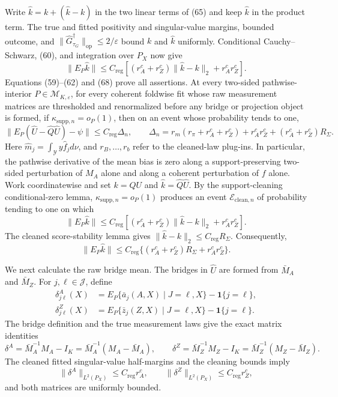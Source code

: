 Write \(\widehat k=k+(\widehat k-k)\) in the two linear terms of (65) and keep \(\widehat k\) in the product term.  The true and fitted positivity and singular-value margins, bounded outcome, and
\(\|\widehat G_{\tau_G}^{\dagger}\|_{\mathrm{op}}\leq2/\varepsilon\) bound \(k\) and \(\widehat k\) uniformly.  Conditional Cauchy--Schwarz, (60), and integration over \(P_X\) now give
\[
 \|E_P\widehat k\|
 \leq C_{\mathrm{reg}}
 \left[(r_A^c+r_Z^c)\|\widehat k-k\|_2+r_A^cr_Z^c\right].      \tag{68}
\]
Equations (59)--(62) and (68) prove all assertions.
At every two-sided pathwise-interior \(P\in\mathcal M_{K,\varepsilon}\), for every coherent foldwise fit whose raw measurement matrices are thresholded and renormalized before any bridge or projection object is formed, if \(\kappa_{\mathrm{supp},n}=o_P(1)\), then on an event whose probability tends to one,
\[
 \|E_P(\widehat U-\widehat Q\widehat U)-\psi\|
 \leq C_{\mathrm{reg}}\Delta_n,
 \qquad
 \Delta_n=r_m(r_\pi+r_A^c+r_Z^c)+r_A^cr_Z^c
 +(r_A^c+r_Z^c)R_\Sigma.
\]
Here \(\widehat m_j=\int_{\mathcal Y}y\widehat f_jd\nu\), and \(r_B,\ldots,r_b\) refer to the cleaned-law plug-ins.  In particular, the pathwise derivative of the mean bias is zero along a support-preserving two-sided perturbation of \(M_A\) alone and along a coherent perturbation of \(f\) alone.
Work coordinatewise and set \(k=QU\) and \(\widehat k=\widehat Q\widehat U\).  By the support-cleaning conditional-zero lemma, \(\kappa_{\mathrm{supp},n}=o_P(1)\) produces an event \(\mathcal E_{\mathrm{clean},n}\) of probability tending to one on which
\[
 \|E_P\widehat k\|
 \leq C_{\mathrm{reg}}
 \left[(r_A^c+r_Z^c)\|\widehat k-k\|_2+r_A^cr_Z^c\right].       \tag{69}
\]
The cleaned score-stability lemma gives \(\|\widehat k-k\|_2\leq C_{\mathrm{reg}}R_\Sigma\).  Consequently,
\[
 \|E_P\widehat k\|
 \leq C_{\mathrm{reg}}
 \{(r_A^c+r_Z^c)R_\Sigma+r_A^cr_Z^c\}.                         \tag{70}
\]

We next calculate the raw bridge mean.  The bridges in \(\widehat U\) are formed from \(\bar M_A\) and \(\bar M_Z\).  For \(j,\ell\in\mathcal J\), define
\[
\begin{aligned}
 \delta^A_{j\ell}(X)
 &=E_P\{\bar a_j(A,X)\mid J=\ell,X\}-\mathbf 1\{j=\ell\},\\
 \delta^Z_{j\ell}(X)
 &=E_P\{\bar z_j(Z,X)\mid J=\ell,X\}-\mathbf 1\{j=\ell\}.
\end{aligned}                                                    \tag{71}
\]
The bridge definition and the true measurement laws give the exact matrix identities
\[
 \delta^A=\bar M_A^{-1}M_A-I_K=\bar M_A^{-1}(M_A-\bar M_A),
 \qquad
 \delta^Z=\bar M_Z^{-1}M_Z-I_K=\bar M_Z^{-1}(M_Z-\bar M_Z).     \tag{72}
\]
The cleaned fitted singular-value half-margins and the cleaning bounds imply
\[
 \|\delta^A\|_{L^2(P_X)}\leq C_{\mathrm{reg}}r_A^c,
 \qquad
 \|\delta^Z\|_{L^2(P_X)}\leq C_{\mathrm{reg}}r_Z^c,            \tag{73}
\]
and both matrices are uniformly bounded.

